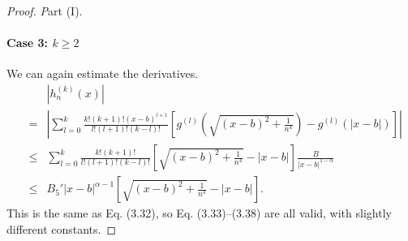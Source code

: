 \documentclass[11pt]{article}
\begin{document}
\begin{proof} {\textit Part (I).}
\paragraph{Case 3: $k\geq 2$} We can again estimate the derivatives.
\begin{eqnarray}
    &&|h_n^{(k)}(x)| \nonumber\\
    &=& \left|\sum_{l=0}^k \frac{k! (k+1)! (x-b)^{l+1}}{l! (l+1)! (k-l)!} \left[g^{(l)}(\sqrt{(x-b)^2+\frac{1}{n^4}})-g^{(l)}(|x-b|)\right]\right| \\
    &\leq& \sum_{l=0}^k \frac{k! (k+1)! }{l! (l+1)! (k-l)!} \left[\sqrt{(x-b)^2+\frac{1}{n^4}}-|x-b|\right] \frac{B}{|x-b|^{1-\alpha}}\label{mvt_g2}\\
    &\leq&  B_5' |x-b|^{\alpha-1}\left[\sqrt{(x-b)^2+\frac{1}{n^4}}-|x-b|\right]. \label{h_n_k_estimate_2}
\end{eqnarray}
This is the same as Eq. (3.32), so Eq. (3.33)--(3.38) are all valid, with slightly different constants.
\end{proof}
\end{document}

